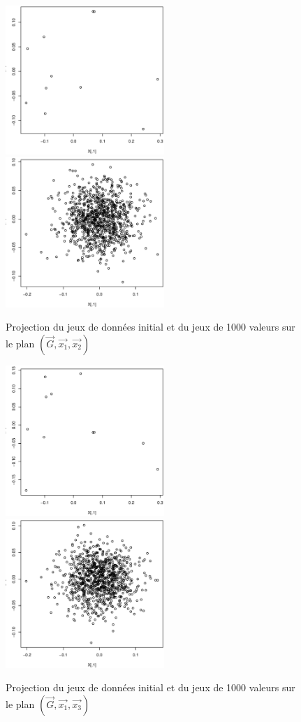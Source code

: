 \documentclass[a4paper]{article}
\begin{document}
\begin{appendices}
\begin{figure}[H]
\includegraphics[width=6cm]{prdata12ex3.eps}\hfill
\includegraphics[width=6cm]{prgener12ex3.eps}
\caption{Projection du jeux de données initial et du jeux de 1000 valeurs sur le plan $(\vec{G},\vec{x_{1}},\vec{x_{2}})$}\label{fig:somefiglabel}
\end{figure}


\begin{figure}[H]
\includegraphics[width=6cm]{prdata13ex3.eps}\hfill
\includegraphics[width=6cm]{prgener13ex3.eps}
\caption{Projection du jeux de données initial et du jeux de 1000 valeurs sur le plan $(\vec{G},\vec{x_{1}},\vec{x_{3}})$}\label{fig:somefiglabel}
\end{figure}


\end{appendices}
\end{document}
